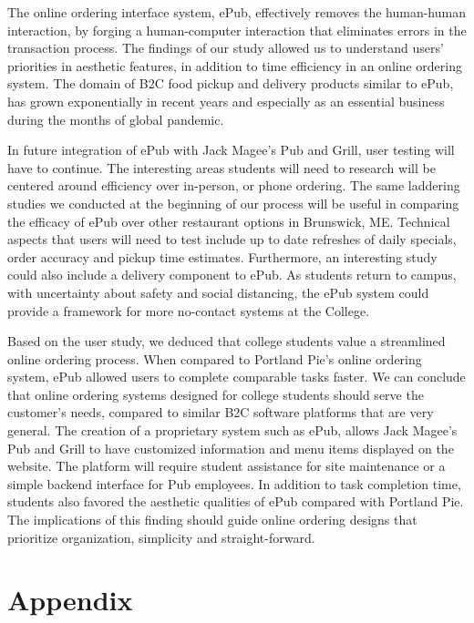 \documentclass[runningheads]{llncs}
\begin{document}
The online ordering interface system, ePub, effectively removes the human-human interaction, by forging a human-computer interaction that eliminates errors in the transaction process. The findings of our study allowed us to understand users’ priorities in aesthetic features, in addition to time efficiency in an online ordering system. The domain of B2C food pickup and delivery products similar to ePub, has grown exponentially in recent years and especially as an essential business during the months of global pandemic.

In future integration of ePub with Jack Magee’s Pub and Grill, user testing will have to continue. The interesting areas students will need to research will be centered around efficiency over in-person, or phone ordering. The same laddering studies we conducted at the beginning of our process will be useful in comparing the efficacy of ePub over other restaurant options in Brunswick, ME. Technical aspects that users will need to test include up to date refreshes of daily specials, order accuracy and pickup time estimates. Furthermore, an interesting study could also include a delivery component to ePub. As students return to campus, with uncertainty about safety and social distancing, the ePub system could provide a framework for more no-contact systems at the College.

Based on the user study, we deduced that college students value a streamlined online ordering process. When compared to Portland Pie’s online ordering system, ePub allowed users to complete comparable tasks faster. We can conclude that online ordering systems designed for college students should serve the customer’s needs, compared to similar B2C software platforms that are very general. The creation of a proprietary system such as ePub, allows Jack Magee’s Pub and Grill to have customized information and menu items displayed on the website. The platform will require student assistance for site maintenance or a simple backend interface for Pub employees. In addition to task completion time, students also favored the aesthetic qualities of ePub compared with Portland Pie. The implications of this finding should guide online ordering designs that prioritize organization, simplicity and straight-forward.

\section{Appendix}
\end{document}
